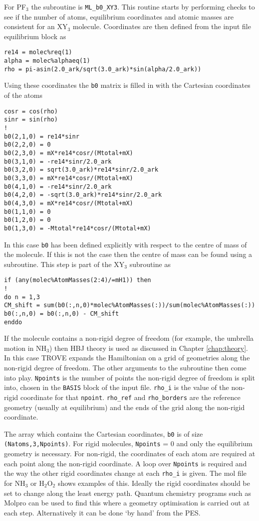 For PF$_3$ the subroutine is \verb|ML_b0_XY3|. This routine starts by performing checks to see if the number of 
atoms, equilibrium coordinates and atomic masses are consistent for an XY$_3$ molecule. Coordinates are then defined from
the input file equilibrium block as
\begin{verbatim}
re14 = molec%req(1)
alpha = molec%alphaeq(1)
rho = pi-asin(2.0_ark/sqrt(3.0_ark)*sin(alpha/2.0_ark))
\end{verbatim}
Using these coordinates the \verb|b0| matrix is filled in with the Cartesian coordinates of the atoms
\begin{verbatim}
cosr = cos(rho)
sinr = sin(rho)
!
b0(2,1,0) = re14*sinr
b0(2,2,0) = 0
b0(2,3,0) = mX*re14*cosr/(Mtotal+mX)
b0(3,1,0) = -re14*sinr/2.0_ark
b0(3,2,0) = sqrt(3.0_ark)*re14*sinr/2.0_ark
b0(3,3,0) = mX*re14*cosr/(Mtotal+mX)
b0(4,1,0) = -re14*sinr/2.0_ark
b0(4,2,0) = -sqrt(3.0_ark)*re14*sinr/2.0_ark
b0(4,3,0) = mX*re14*cosr/(Mtotal+mX)
b0(1,1,0) = 0
b0(1,2,0) = 0
b0(1,3,0) = -Mtotal*re14*cosr/(Mtotal+mX)
\end{verbatim}

In this case \verb|b0| has been defined explicitly with respect to the centre of mass of the molecule. If this is 
not the case then the centre of mass can be found using a subroutine. This step is part of the XY$_3$ subroutine as
\begin{verbatim}
if (any(molec%AtomMasses(2:4)/=mH1)) then
!
do n = 1,3
CM_shift = sum(b0(:,n,0)*molec%AtomMasses(:))/sum(molec%AtomMasses(:))
b0(:,n,0) = b0(:,n,0) - CM_shift
enddo
\end{verbatim}


If the molecule contains a non-rigid degree of freedom (for example, the umbrella motion in NH$_3$) then HBJ theory is used
as discussed in Chapter \ref{chap:theory}. In this case TROVE expands the Hamiltonian on a grid of geometries along the 
non-rigid degree of freedom. The other arguments to the subroutine then come into play. \verb|Npoints| is the number of 
points the non-rigid degree of freedom is split into, chosen in the \verb|BASIS| block of the input file. \verb|rho_i| 
is the value of the non-rigid coordinate for that \verb|npoint|. \verb|rho_ref| and \verb|rho_borders| are the reference
geometry (usually at equilibrium) and the ends of the grid along the non-rigid coordinate.

The array which contains the Cartesian coordinates, \verb|b0| is of size \verb|(Natoms,3,Npoints)|. For rigid molecules, 
\verb|Npoints| = 0 and only the equilibrium geometry is necessary. For non-rigid, the coordinates of each atom are required
at each point along the non-rigid coordinate. A loop over  \verb|Npoints| is required and the way the other rigid 
coordinates change at each \verb|rho_i| is given. The mol file for NH$_3$ or H$_2$O$_2$ shows examples of this. 
Ideally the rigid coordinates should be set to change along the least energy path. Quantum chemistry programs such as 
Molpro \cite{Molpro} can be used to find this where a geometry optimisation is carried out at each step. Alternatively
it can be done `by hand' from the PES.




